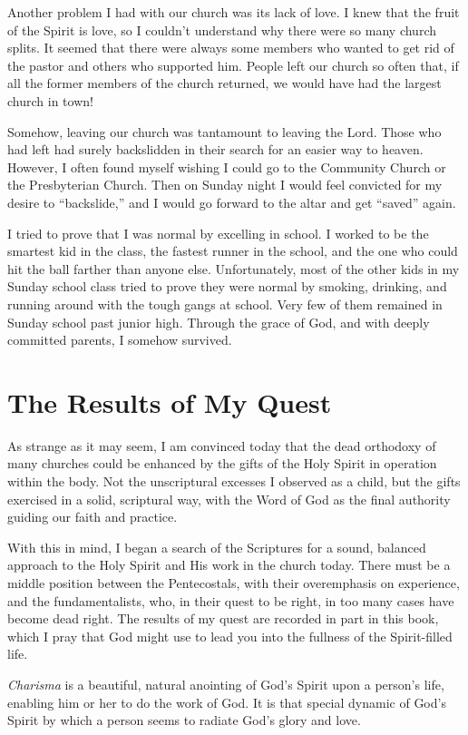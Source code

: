 Another problem I had with our church was its lack
of love. I knew that the fruit of the Spirit is love, so I
couldn’t understand why there were so many church splits.
It seemed that there were always some members who
wanted to get rid of the pastor and others who supported
him. People left our church so often that, if all the former
members of the church returned, we would have had the
largest church in town!

Somehow, leaving our church was tantamount to leaving
the Lord. Those who had left had surely backslidden in
their search for an easier way to heaven. However, I often
found myself wishing I could go to the Community Church
or the Presbyterian Church. Then on Sunday night I would
feel convicted for my desire to “backslide,” and I would go
forward to the altar and get “saved” again.

I tried to prove that I was normal by excelling in school.
I worked to be the smartest kid in the class, the fastest
runner in the school, and the one who could hit the ball
farther than anyone else. Unfortunately, most of the other
kids in my Sunday school class tried to prove they were
normal by smoking, drinking, and running around with
the tough gangs at school. Very few of them remained in
Sunday school past junior high. Through the grace of God,
and with deeply committed parents, I somehow survived.


\section*{The Results of My Quest}

As strange as it may seem, I am convinced today that
the dead orthodoxy of many churches could be enhanced
by the gifts of the Holy Spirit in operation within the body.
Not the unscriptural excesses I observed as a child, but the
gifts exercised in a solid, scriptural way, with the Word of
God as the final authority guiding our faith and practice.

With this in mind, I began a search of the Scriptures
for a sound, balanced approach to the Holy Spirit and His
work in the church today. There must be a middle position
between the Pentecostals, with their overemphasis on experience,
and the fundamentalists, who, in their quest to be
right, in too many cases have become dead right. The results
of my quest are recorded in part in this book, which I pray
that God might use to lead you into the fullness of the
Spirit-filled life.

\emph{Charisma} is a beautiful, natural anointing of God’s Spirit
upon a person’s life, enabling him or her to do the work of
God. It is that special dynamic of God’s Spirit by which a
person seems to radiate God’s glory and love.

